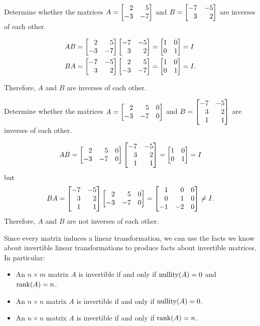 \begin{example}
	Determine whether the matrices $A=\mat{2&5\\-3&-7}$ and $B=\mat{-7&-5\\3&2}$ are inverses of each other.

	\begin{align*}
	    AB &=\mat{2&5\\-3&-7}\mat{-7&-5\\3&2} =\mat{1&0\\0&1} = I\\
	    BA &=\mat{-7&-5\\3&2}\mat{2&5\\-3&-7} =\mat{1&0\\0&1} = I .
	\end{align*}

	Therefore,  $A$ and $B$ are inverses of each other.
\end{example}

\begin{example}
	Determine whether the matrices $A=\mat{2&5&0\\-3&-7&0}$ and $B=\mat{-7&-5\\3&2\\1&1}$ are inverses of each other.

	\[
	    AB =\mat{2&5&0\\-3&-7&0}\mat{-7&-5\\3&2\\1&1}=\mat{1&0\\0&1}=I
	    \]but\[
	    BA =\mat{-7&-5\\3&2\\1&1}\mat{2&5&0\\-3&-7&0}=\mat{1&0&0\\0&1&0\\-1&-2&0}\neq I.
	\]
	Therefore,  $A$ and $B$ are not inverses of each other.
\end{example}

Since every matrix induces a linear transformation, we can use the facts we know about invertible linear
transformations to produce facts about invertible matrices. In particular:
\begin{itemize}
	\item An $n\times m$ matrix $A$ is invertible if and only if $\operatorname{nullity}(A)=0$ and $\operatorname{rank}(A)=n$.
	\item An $n\times n$ matrix $A$ is invertible if and only if $\operatorname{nullity}(A)=0$.
	\item An $n\times n$ matrix $A$ is invertible if and only if $\operatorname{rank}(A)=n$.
\end{itemize}

